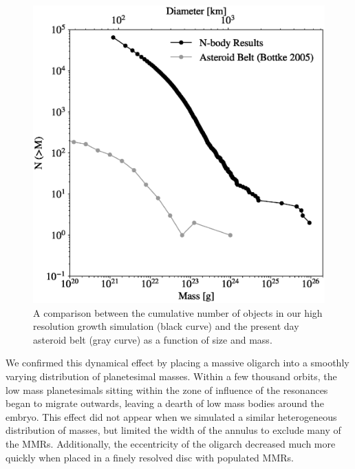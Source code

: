 \begin{figure}
    \includegraphics[width=\columnwidth]{figures/plSS/cum_asteroid_comparison.eps}
    \caption{A comparison between the cumulative number of objects in our high resolution growth simulation (black curve) and 
    the present day asteroid belt \cite{bottke05} (gray curve) as a function of size and mass.}
    \label{fig:mass_dist_ast_compare}
\end{figure}


We confirmed this dynamical effect by placing a massive oligarch into a smoothly varying distribution of planetesimal masses. 
Within a few thousand orbits, the low mass planetesimals sitting within the zone of influence of the resonances began to migrate 
outwards, leaving a dearth of low mass bodies around the embryo. This effect did not appear when we simulated a similar 
heterogeneous distribution of masses, but limited the width of the annulus to exclude many of the MMRs. Additionally, the 
eccentricity of the oligarch decreased much more quickly when placed in a finely resolved disc with populated MMRs.

